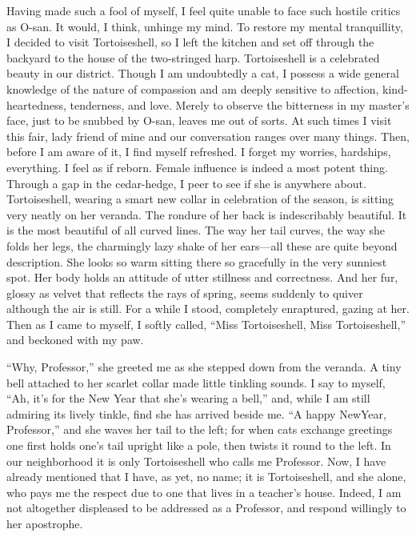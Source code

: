 \documentclass{book}
\begin{document}
Having made such a fool of myself, I feel quite unable to face such
hostile critics as O-san. It would, I think, unhinge my mind. To restore
my mental tranquillity, I decided to visit Tortoiseshell, so I left the
kitchen and set off through the backyard to the house of the
two-stringed harp. Tortoiseshell is a celebrated beauty in our district.
Though I am undoubtedly a cat, I possess a wide general knowledge of the
nature of compassion and am deeply sensitive to affection,
kind-heartedness, tenderness, and love. Merely to observe the bitterness
in my master's face, just to be snubbed by O-san, leaves me out of
sorts. At such times I visit this fair, lady friend of mine and our
conversation ranges over many things. Then, before I am aware of it, I
find myself refreshed. I forget my worries, hardships, everything. I
feel as if reborn. Female influence is indeed a most potent thing.
Through a gap in the cedar-hedge, I peer to see if she is anywhere
about. Tortoiseshell, wearing a smart new collar in celebration of the
season, is sitting very neatly on her veranda. The rondure of her back
is indescribably beautiful. It is the most beautiful of all curved
lines. The way her tail curves, the way she folds her legs, the
charmingly lazy shake of her ears---all these are quite beyond
description. She looks so warm sitting there so gracefully in the very
sunniest spot. Her body holds an attitude of utter stillness and
correctness. And her fur, glossy as velvet that reflects the rays of
spring, seems suddenly to quiver although the air is still. For a while
I stood, completely enraptured, gazing at her. Then as I came to myself,
I softly called, ``Miss Tortoiseshell, Miss Tortoiseshell,'' and
beckoned with my paw.

``Why, Professor,'' she greeted me as she stepped down from the veranda.
A tiny bell attached to her scarlet collar made little tinkling sounds.
I say to myself, ``Ah, it's for the New Year that she's wearing a
bell,'' and, while I am still admiring its lively tinkle, find she has
arrived beside me. ``A happy NewYear, Professor,'' and she waves her
tail to the left; for when cats exchange greetings one first holds one's
tail upright like a pole, then twists it round to the left. In our
neighborhood it is only Tortoiseshell who calls me Professor. Now, I
have already mentioned that I have, as yet, no name; it is
Tortoiseshell, and she alone, who pays me the respect due to one that
lives in a teacher's house. Indeed, I am not altogether displeased to be
addressed as a Professor, and respond willingly to her apostrophe.
\end{document}
